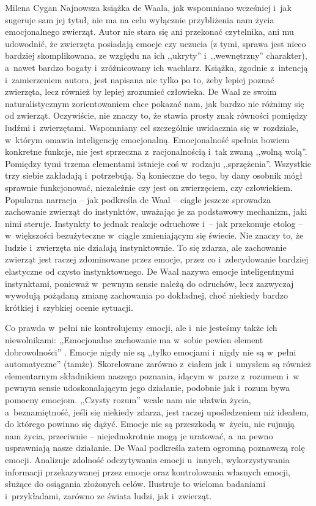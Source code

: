 \begin{newrevplenv}{Milena Cygan}
Najnowsza książka de Waala, jak wspomniano wcześniej i~jak sugeruje sam jej tytuł, nie ma na celu wyłącznie przybliżenia nam życia emocjonalnego zwierząt. Autor nie stara się ani przekonać czytelnika, ani mu udowodnić, że zwierzęta posiadają emocje czy uczucia (z tymi, sprawa jest nieco bardziej skomplikowana, ze względu na ich ,,ukryty'' i~,,wewnętrzny'' charakter), a~nawet bardzo bogaty i~zróżnicowany ich wachlarz. Książka, zgodnie z~intencją i~zamierzeniem autora, jest napisana nie tylko po to, żeby lepiej poznać zwierzęta, lecz również by lepiej zrozumieć człowieka. De Waal ze swoim naturalistycznym zorientowaniem chce pokazać nam, jak bardzo nie różnimy się od zwierząt. Oczywiście, nie znaczy to, że stawia prosty znak równości pomiędzy ludźmi i~zwierzętami. Wspomniany cel szczególnie uwidacznia się w~rozdziale, w~którym omawia inteligencję emocjonalną. Emocjonalność spełnia bowiem konkretne funkcje, nie jest sprzeczna z~racjonalnością i~tak zwaną ,,wolną wolą''. Pomiędzy tymi trzema elementami istnieje coś w~rodzaju ,,sprzężenia''. Wszystkie trzy siebie zakładają i~potrzebują. Są konieczne do tego, by dany osobnik mógł sprawnie funkcjonować, niezależnie czy jest on zwierzęciem, czy człowiekiem. Popularna narracja -- jak podkreśla de Waal -- ciągle jeszcze sprowadza zachowanie zwierząt do instynktów, uważając je za podstawowy mechanizm, jaki nimi steruje. Instynkty to jednak reakcje odruchowe i~-- jak przekonuje etolog -- w~większości bezużyteczne w~ciągle zmieniającym się świecie. Nie znaczy to, że ludzie i~zwierzęta nie działają instynktownie. To się zdarza, ale zachowanie zwierząt jest raczej zdominowane przez emocje, przez co i~zdecydowanie bardziej elastyczne od czysto instynktownego. De Waal nazywa emocje inteligentnymi instynktami, ponieważ w~pewnym sensie należą do odruchów, lecz zazwyczaj wywołują pożądaną zmianę zachowania po dokładnej, choć niekiedy bardzo krótkiej i~szybkiej ocenie sytuacji.

Co prawda w~pełni nie kontrolujemy emocji, ale i~nie jesteśmy także ich niewolnikami: ,,Emocjonalne zachowanie ma w~sobie pewien element dobrowolności''
\parencite[][s.~248]{waal_ostatni_2019}. %
 Emocje nigdy nie są ,,tylko emocjami i~nigdy nie są w~pełni automatyczne'' (tamże). Skorelowane zarówno z~ciałem jak i~umysłem są również elementarnym składnikiem naszego poznania, idącym w~parze z~rozumem i~w pewnym sensie udoskonalającym jego działanie, podobnie jak i~rozum bywa pomocny emocjom. ,,Czysty rozum'' wcale nam nie ułatwia życia, a~beznamiętność, jeśli się niekiedy zdarza, jest raczej upośledzeniem niż ideałem, do którego powinno się dążyć. Emocje nie są przeszkodą w~życiu, nie rujnują nam życia, przeciwnie -- niejednokrotnie mogą je uratować, a~na pewno usprawniają nasze działanie. De Waal podkreśla zatem ogromną poznawczą rolę emocji. Analizuje zdolność odczytywania emocji u~innych, wykorzystywania informacji przekazywanej przez emocje oraz kontrolowania własnych emocji, służące do osiągania złożonych celów. Ilustruje to wieloma badaniami i~przykładami, zarówno ze świata ludzi, jak i~zwierząt.


\end{newrevplenv}

